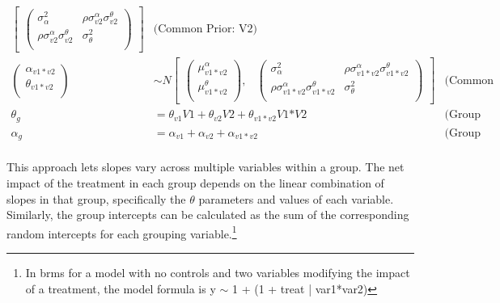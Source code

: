 \documentclass[12pt]{article}
\begin{document}
\begin{align*}
\begin{bmatrix}
\begin{pmatrix}
\sigma^2_\alpha & \rho \sigma^\alpha_{v2} \sigma^\theta_{v2} \\
\rho \sigma^\alpha_{v2} \sigma^\theta_{v2} & \sigma^2_\theta \\
\end{pmatrix}
\end{bmatrix} & \text{(Common Prior: V2)} \\ 
\begin{pmatrix} 
\alpha_{v1*v2} \\
\theta_{v1*v2} \\
\end{pmatrix} &\sim  N
\begin{bmatrix}
\begin{pmatrix}
\mu^\alpha_{v1*v2} \\
\mu^\theta_{v1*v2} \\
\end{pmatrix}\!\!,&
\begin{pmatrix}
\sigma^2_\alpha & \rho \sigma^\alpha_{v1*v2} \sigma^\theta_{v1*v2} \\
\rho \sigma^\alpha_{v1*v2} \sigma^\theta_{v1*v2} & \sigma^2_\theta \\
\end{pmatrix}
\end{bmatrix} & \text{(Common Prior: V1*V2)} \\ 
\theta_g &= \theta_{v1} \textit{V1} + \theta_{v2} \textit{V2} + \theta_{v1*v2} \textit{V1*V2} & \text{(Group Slopes)} \\
\alpha_g &= \alpha_{v1} + \alpha_{v2} + \alpha_{v1*v2} & \text{(Group Intercepts)} \\
\end{align*}


This approach lets slopes vary across multiple variables within a group. 
The net impact of the treatment in each group depends on the linear combination of slopes in that group, specifically the $\theta$ parameters and values of each variable. 
Similarly, the group intercepts can be calculated as the sum of the corresponding random intercepts for each grouping variable.\footnote{In brms for a model with no controls and two variables modifying the impact of a treatment, the model formula is y $\sim$ 1 + (1 + treat | var1*var2)}  


\end{document}
